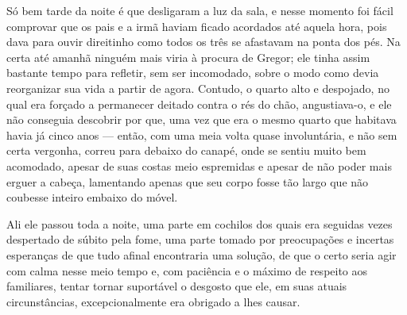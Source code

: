 Só bem tarde da noite é que desligaram a luz da sala, e nesse momento foi
fácil comprovar que os pais e a irmã haviam ficado acordados até aquela
hora, pois dava para ouvir direitinho como todos os três se afastavam na
ponta dos pés. Na certa até amanhã ninguém mais viria à procura de Gregor;
ele tinha assim bastante tempo para refletir, sem ser incomodado, sobre o
modo como devia reorganizar sua vida a partir de agora. Contudo, o quarto
alto e despojado, no qual era forçado a permanecer deitado contra o rés do
chão, angustiava-o, e ele não conseguia descobrir por que, uma vez que era
o mesmo quarto que habitava havia já cinco anos --- então, com uma meia
volta quase involuntária, e não sem certa vergonha, correu para debaixo do
canapé, onde se sentiu muito bem acomodado, apesar de suas costas meio
espremidas e apesar de não poder mais erguer a cabeça, lamentando apenas
que seu corpo fosse tão largo que não coubesse inteiro embaixo do móvel.

Ali ele passou toda a noite, uma parte em cochilos dos quais era seguidas
vezes despertado de súbito pela fome, uma parte tomado por preocupações
e incertas esperanças de que tudo afinal encontraria uma solução, de que o
certo seria agir com calma nesse meio tempo e, com paciência e o máximo de
respeito aos familiares, tentar tornar suportável o desgosto que ele, em
suas atuais circunstâncias, excepcionalmente era obrigado a lhes causar.

